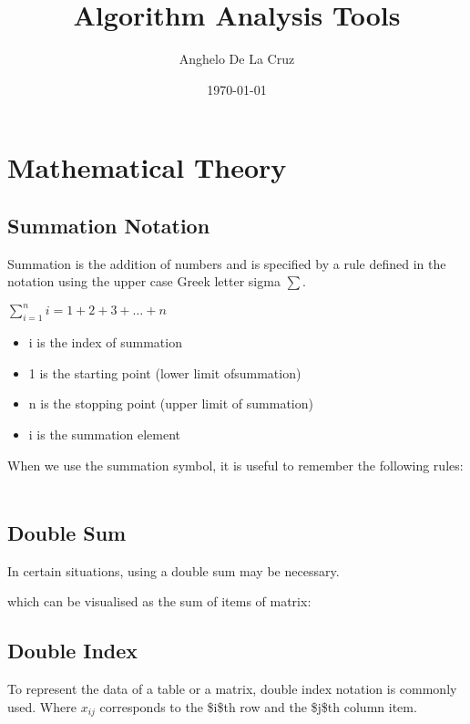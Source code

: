 \documentclass[11pt]{article}
\author{Anghelo De La Cruz}
\date{\today}
\title{Algorithm Analysis Tools}
\begin{document}
\maketitle
\tableofcontents


\section{Mathematical Theory}
\label{sec-1}

\subsection{Summation Notation}
\label{sec-1-1}

Summation is the addition of numbers and is
specified by a rule defined in the notation using the upper case Greek
letter sigma $\sum$.

$\sum_{i=1}^{n} i = 1 + 2 + 3 + \dots + n$

\begin{itemize}
\item i is the index of summation
\item 1 is the starting point (lower limit ofsummation)
\item n is the stopping point (upper limit of summation)
\item i is the summation element
\end{itemize}

When we use the summation symbol, it is useful to remember the following rules:

\begin{align*}

\end{align*}

\subsection{Double Sum}
\label{sec-1-2}

In certain situations, using a double sum may be necessary.


which can be visualised as the sum of items of matrix:

\subsection{Double Index}
\label{sec-1-3}

To represent the data of a table or a matrix, double index notation is
commonly used. Where $x_{ij}$ corresponds to the \$i\$th row and the
\$j\$th column item.
\end{document}
